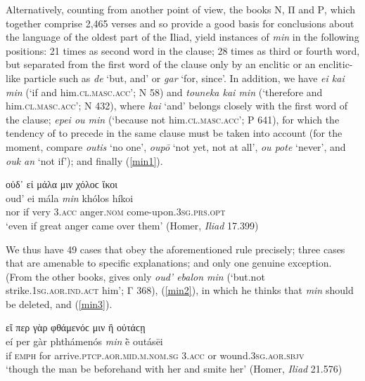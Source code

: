 Alternatively, counting from another point of view, the books Ν, Π and Ρ, which together comprise 2,465 verses and so provide a good basis for conclusions about the language of the oldest part of the Iliad, yield instances of \emph{min} in the following positions: 21 times as second word in the clause; 28 times as third or fourth word, but separated from the first word of the clause only by an enclitic or an enclitic-like particle such as \emph{de} `but, and' or \emph{gar} `for, since'. In addition, we have \emph{ei kai min} (`if and him.\textsc{cl.masc.acc}'; Ν 58) and \emph{touneka kai min} (`therefore and him.\textsc{cl.masc.acc}'; Ν 432), where \emph{kai} `and' belongs closely with the first word of the clause; \emph{epei ou min} (`because not him.\textsc{cl.masc.acc}'; Ρ 641), for which the tendency of  to precede  in the same clause must be taken into account (for the moment, compare \emph{outis} `no one', \emph{oupō} `not yet, not at all', \emph{ou pote} `never', and \emph{ouk an} `not if');\label{ouk1} and finally (\ref{min1}).

\begin{exe}
\ex οὐδ᾽ εἰ μάλα μιν χόλοϲ ἵκοι\\
\gll oud' ei mála \emph{min} khólos híkoi\\
nor if very \textsc{3.acc} anger.\textsc{nom} come-upon.\textsc{3sg.prs.opt}\\
\trans `even if great anger came over them' (Homer, \emph{Iliad} 17.399)
\label{min1}
\end{exe}

We thus have 49 cases that obey the aforementioned rule precisely; three cases that are amenable to specific explanations; and only one genuine exception. (From the other books, \citet[337f.]{Monro1891} gives only \emph{oud' ebalon min} (`but.not strike.\textsc{1sg.aor.ind.act} him'; Γ 368), (\ref{min2}), in which he thinks that \emph{min} should be deleted, and (\ref{min3}).

\begin{exe}
\ex εἴ περ γὰρ φθάμενόϲ {μιν} ἢ οὐτάϲῃ\\
\gll eí per gàr phthámenós \emph{min} ḕ outásēi\\
if \textsc{emph} for arrive.\textsc{ptcp.aor.mid.m.nom.sg} \textsc{3.acc} or wound.\textsc{3sg.aor.sbjv} \\
\trans `though the man be beforehand with her and smite her' (Homer, \emph{Iliad} 21.576)
\label{min2}
\end{exe}

